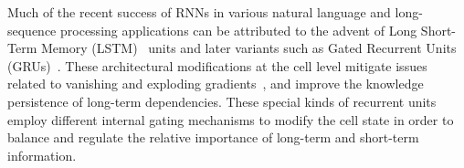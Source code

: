 Much of the recent success of RNNs in various natural language and long-sequence processing applications can be attributed to the advent of Long Short-Term Memory (LSTM)~\cite{ref:LSTM} units and later variants such as Gated Recurrent Units (GRUs)~\cite{ref:GRU,cho14}. These architectural modifications at the cell level mitigate issues related to vanishing and exploding gradients~\cite{hochreiter1991untersuchungen,Bengio:1994:LLD:2325857.2328340,DBLP:journals/corr/abs-1211-5063}, and improve the knowledge persistence of long-term dependencies. These special kinds of recurrent units employ different internal gating mechanisms to modify the cell state in order to balance and regulate the relative importance of long-term and short-term information.
